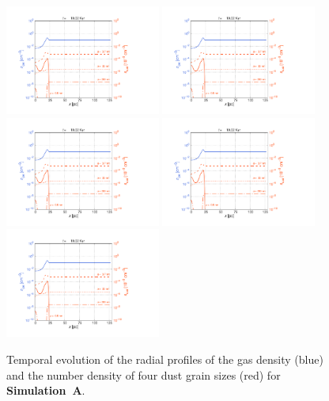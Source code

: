 \documentclass[fleqn,usenatbib]{mnras}
\begin{document}
  \begin{figure}
  \includegraphics[trim=2.4cm 1.5cm 9.0cm 2.0cm, clip=true,page=1,height = 3.6cm]{Pics/Pics_A2/Profile_dust.pdf}\hspace*{-0.05cm} 
  \includegraphics[trim=5.5cm 1.5cm 9.0cm 2.0cm, clip=true,page=2,height = 3.6cm]{Pics/Pics_A2/Profile_dust.pdf}\hspace*{-0.05cm} 
  \includegraphics[trim=5.5cm 1.5cm 9.0cm 2.0cm, clip=true,page=4,height = 3.6cm]{Pics/Pics_A2/Profile_dust.pdf}\hspace*{-0.05cm} 
  \includegraphics[trim=5.5cm 1.5cm 9.0cm 2.0cm, clip=true,page=5,height = 3.6cm]{Pics/Pics_A2/Profile_dust.pdf}\hspace*{-0.05cm} 
  \includegraphics[trim=5.5cm 1.5cm 6.0cm 2.0cm, clip=true,page=6,height = 3.6cm]{Pics/Pics_A2/Profile_dust.pdf}
  \caption{Temporal evolution of the radial profiles of the gas density (blue) and the number density of four dust grain sizes (red) for \textbf{Simulation~A}.}
   \label{fig_prof_A2} 
  \end{figure}   
  
\end{document}
